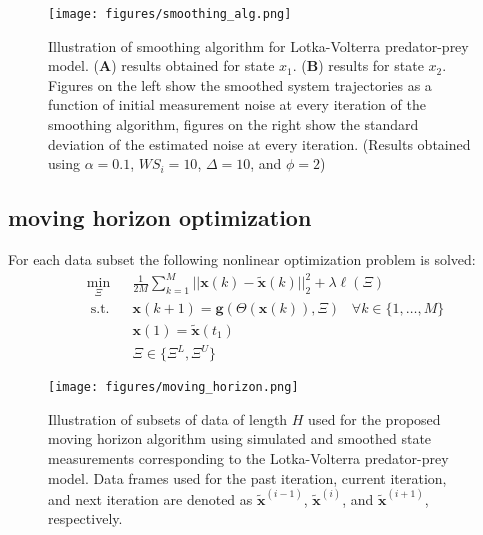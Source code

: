 \documentclass[12pt]{article}
\begin{document}
\begin{figure}[h!]
\centering
\texttt{[image: figures/smoothing\_alg.png]}
\caption{Illustration of smoothing algorithm for Lotka-Volterra predator-prey model. (\textbf{A})  results obtained for state $x_1$. (\textbf{B})  results for state $x_2$. Figures on the left show the smoothed system trajectories as a function of initial measurement noise at every iteration of the smoothing algorithm, figures on the right show the standard deviation of the estimated noise  at every iteration. (Results obtained using $\alpha=0.1$, $WS_i=10$, $\Delta=10$, and $\phi = 2$)}
\end{figure}


\clearpage

\subsection[S]{\ours{} moving horizon optimization}

For each data subset the following nonlinear optimization problem is solved:
\begin{equation}
\label{eq:dyn_opt_disc}
\begin{aligned}
& \min_{\Xi} && \frac{1}{2M} \sum_{k=1}^{M}||\textbf{x}(k)-\tilde{\textbf{x}}(k)||_2^2 + \lambda \ell(\Xi)\\
& \; \text{s.t.} && \textbf{x}({k+1}) = \textbf{g}(\Theta(\textbf{x}(k)),\Xi)  \;\;\; \forall k\in \{1,\dots,M\}\\
& \; &&\textbf{x}(1) = \tilde{\textbf{x}}(t_1) \\
& \; && \Xi \in \{ \Xi^{L}, \Xi^{U} \}
\end{aligned}
\end{equation} 


\begin{figure}[h!]
\centering
\texttt{[image: figures/moving\_horizon.png]}
\caption{Illustration of subsets of data of length $H$ used for the proposed moving horizon algorithm using simulated and smoothed state measurements corresponding to the Lotka-Volterra predator-prey model. Data frames used for the past iteration, current iteration, and next iteration are denoted as $\tilde{\textbf{x}}^{(i-1)}$, $\tilde{\textbf{x}}^{(i)}$, and $\tilde{\textbf{x}}^{(i+1)}$, respectively.
}
\end{figure}
\end{document}
